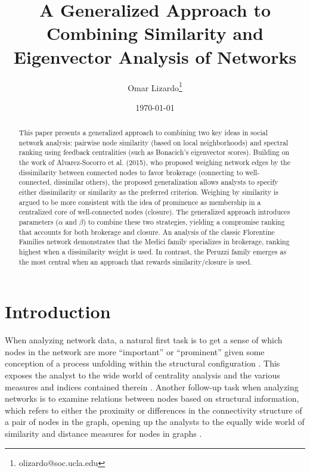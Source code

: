 \documentclass[12pt]{article}
\begin{document}
\title{A Generalized Approach to Combining Similarity and Eigenvector Analysis of Networks}
\author[1]{Omar Lizardo\thanks{olizardo@soc.ucla.edu}}

\renewcommand\Authands{ and }

\date{\normalsize \today}	
\maketitle

\newpage
\begin{abstract}
This paper presents a generalized approach to combining two key ideas in social network analysis: pairwise node similarity (based on local neighborhoods) and spectral ranking using feedback centralities (such as Bonacich's eigenvector scores). Building on the work of Alvarez-Socorro et al. (2015), who proposed weighing network edges by the dissimilarity between connected nodes to favor brokerage (connecting to well-connected, dissimilar others), the proposed generalization allows analysts to specify either dissimilarity or similarity as the preferred criterion. Weighing by similarity is argued to be more consistent with the idea of prominence as membership in a centralized core of well-connected nodes (closure). The generalized approach introduces parameters ($\alpha$ and $\beta$) to combine these two strategies, yielding a compromise ranking that accounts for both brokerage and closure. An analysis of the classic Florentine Families network demonstrates that the Medici family specializes in brokerage, ranking highest when a dissimilarity weight is used. In contrast, the Peruzzi family emerges as the most central when an approach that rewards similarity/closure is used.
\end{abstract}

\newpage
\section*{Introduction}
When analyzing network data, a natural first task is to get a sense of which nodes in the network are more ``important'' or ``prominent'' given some conception of a process unfolding within the structural configuration \citep{borgatti2005centrality-07f}. This exposes the analyst to the wide world of centrality analysis and the various measures and indices contained therein \citep{borgatti2006graph-theoretic-1a0}. Another follow-up task when analyzing networks is to examine relations between nodes based on structural information, which refers to either the proximity or differences in the connectivity structure of a pair of nodes in the graph, opening up the analysts to the equally wide world of similarity and distance measures for nodes in graphs \citep{fouss2005novel-8b2, leicht2006vertex-6f1}. 
\end{document}
